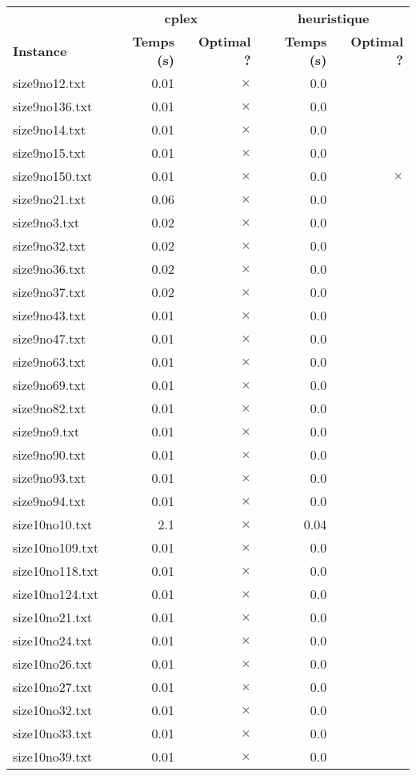 \documentclass{article}
\begin{document}
\newpage
\begin{center}
\renewcommand{\arraystretch}{1.4} 
 \begin{tabular}{lrrrr}
	\hline
 & \multicolumn{2}{c}{\textbf{cplex}} & \multicolumn{2}{c}{\textbf{heuristique}}\\
\textbf{Instance}  & \textbf{Temps (s)} & \textbf{Optimal ?}  & \textbf{Temps (s)} & \textbf{Optimal ?} \\\hline

size9no12.txt & 0.01 & 
$\times$
 & 0.0 & 
\\
size9no136.txt & 0.01 & 
$\times$
 & 0.0 & 
\\
size9no14.txt & 0.01 & 
$\times$
 & 0.0 & 
\\
size9no15.txt & 0.01 & 
$\times$
 & 0.0 & 
\\
size9no150.txt & 0.01 & 
$\times$
 & 0.0 & 
$\times$
\\
size9no21.txt & 0.06 & 
$\times$
 & 0.0 & 
\\
size9no3.txt & 0.02 & 
$\times$
 & 0.0 & 
\\
size9no32.txt & 0.02 & 
$\times$
 & 0.0 & 
\\
size9no36.txt & 0.02 & 
$\times$
 & 0.0 & 
\\
size9no37.txt & 0.02 & 
$\times$
 & 0.0 & 
\\
size9no43.txt & 0.01 & 
$\times$
 & 0.0 & 
\\
size9no47.txt & 0.01 & 
$\times$
 & 0.0 & 
\\
size9no63.txt & 0.01 & 
$\times$
 & 0.0 & 
\\
size9no69.txt & 0.01 & 
$\times$
 & 0.0 & 
\\
size9no82.txt & 0.01 & 
$\times$
 & 0.0 & 
\\
size9no9.txt & 0.01 & 
$\times$
 & 0.0 & 
\\
size9no90.txt & 0.01 & 
$\times$
 & 0.0 & 
\\
size9no93.txt & 0.01 & 
$\times$
 & 0.0 & 
\\
size9no94.txt & 0.01 & 
$\times$
 & 0.0 & 
\\
size10no10.txt & 2.1 & 
$\times$
 & 0.04 & 
\\
size10no109.txt & 0.01 & 
$\times$
 & 0.0 & 
\\
size10no118.txt & 0.01 & 
$\times$
 & 0.0 & 
\\
size10no124.txt & 0.01 & 
$\times$
 & 0.0 & 
\\
size10no21.txt & 0.01 & 
$\times$
 & 0.0 & 
\\
size10no24.txt & 0.01 & 
$\times$
 & 0.0 & 
\\
size10no26.txt & 0.01 & 
$\times$
 & 0.0 & 
\\
size10no27.txt & 0.01 & 
$\times$
 & 0.0 & 
\\
size10no32.txt & 0.01 & 
$\times$
 & 0.0 & 
\\
size10no33.txt & 0.01 & 
$\times$
 & 0.0 & 
\\
size10no39.txt & 0.01 & 
$\times$
 & 0.0 & 
\\
\hline\end{tabular}
\end{center}
\end{document}

